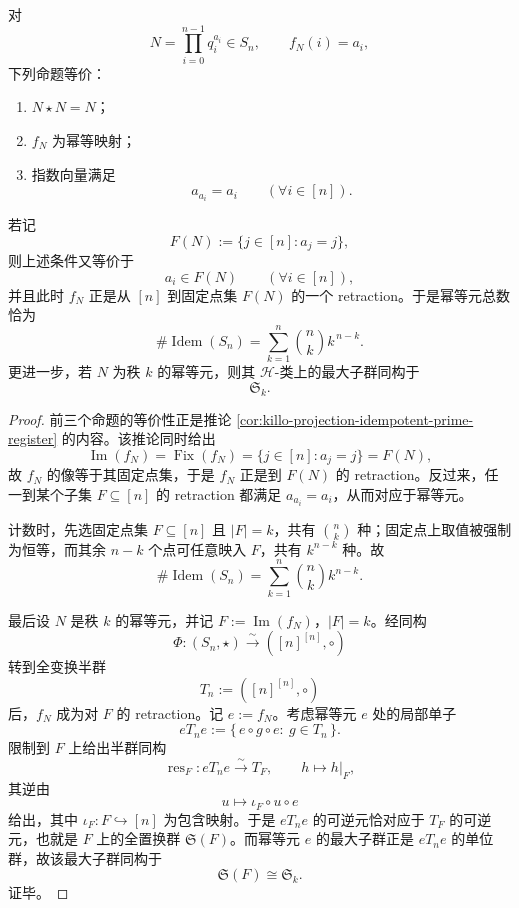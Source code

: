 \begin{theorem}\label{thm:conclusion-prime-register-idempotent-retraction-normal-form}
对
\[
N=\prod_{i=0}^{n-1}q_i^{a_i}\in S_n,
\qquad
f_N(i)=a_i,
\]
下列命题等价：
\begin{enumerate}
\item \(N\star N=N\)；
\item \(f_N\) 为幂等映射；
\item 指数向量满足
\[
a_{a_i}=a_i
\qquad (\forall i\in[n]).
\]
\end{enumerate}
若记
\[
F(N):=\{j\in[n]:a_j=j\},
\]
则上述条件又等价于
\[
a_i\in F(N)\qquad (\forall i\in[n]),
\]
并且此时 \(f_N\) 正是从 \([n]\) 到固定点集 \(F(N)\) 的一个 retraction。于是幂等元总数恰为
\[
\#\operatorname{Idem}(S_n)
=
\sum_{k=1}^{n}\binom{n}{k}k^{\,n-k}.
\]
更进一步，若 \(N\) 为秩 \(k\) 的幂等元，则其 \(\mathcal H\)-类上的最大子群同构于
\[
\mathfrak S_k.
\]
\end{theorem}
\begin{proof}
前三个命题的等价性正是推论 \ref{cor:killo-projection-idempotent-prime-register} 的内容。该推论同时给出
\[
\operatorname{Im}(f_N)=\operatorname{Fix}(f_N)=\{j\in[n]:a_j=j\}=F(N),
\]
故 \(f_N\) 的像等于其固定点集，于是 \(f_N\) 正是到 \(F(N)\) 的 retraction。反过来，任一到某个子集 \(F\subseteq[n]\) 的 retraction 都满足 \(a_{a_i}=a_i\)，从而对应于幂等元。

计数时，先选固定点集 \(F\subseteq[n]\) 且 \(|F|=k\)，共有 \(\binom{n}{k}\) 种；固定点上取值被强制为恒等，而其余 \(n-k\) 个点可任意映入 \(F\)，共有 \(k^{n-k}\) 种。故
\[
\#\operatorname{Idem}(S_n)=\sum_{k=1}^{n}\binom{n}{k}k^{n-k}.
\]

最后设 \(N\) 是秩 \(k\) 的幂等元，并记 \(F:=\operatorname{Im}(f_N)\)，\(|F|=k\)。经同构
\[
\Phi:(S_n,\star)\xrightarrow{\sim}([n]^{[n]},\circ)
\]
转到全变换半群
\[
T_n:=([n]^{[n]},\circ)
\]
后，\(f_N\) 成为对 \(F\) 的 retraction。记 \(e:=f_N\)。考虑幂等元 \(e\) 处的局部单子
\[
eT_ne:=\{\,e\circ g\circ e:\ g\in T_n\,\}.
\]
限制到 \(F\) 上给出半群同构
\[
\operatorname{res}_F:eT_ne\xrightarrow{\sim}T_F,
\qquad
h\longmapsto h|_F,
\]
其逆由
\[
u\longmapsto \iota_F\circ u\circ e
\]
给出，其中 \(\iota_F:F\hookrightarrow [n]\) 为包含映射。于是 \(eT_ne\) 的可逆元恰对应于 \(T_F\) 的可逆元，也就是 \(F\) 上的全置换群 \(\mathfrak S(F)\)。而幂等元 \(e\) 的最大子群正是 \(eT_ne\) 的单位群，故该最大子群同构于
\[
\mathfrak S(F)\cong \mathfrak S_k.
\]
证毕。
\end{proof}


